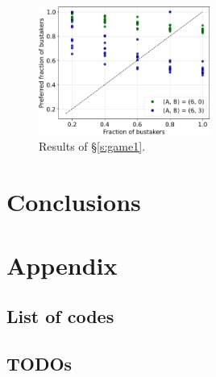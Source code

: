 \documentclass[12pt,notitlepage]{article}
\begin{document}
\begin{figure}
\centering
\includegraphics[width=0.5\textwidth]{20210616-OPT1/c_grid_study1/UTC-20210621-232339/e_evo_plots/evo}

\caption{%
	\protect{}
	Results of \S\ref{s:game1}.
}
\label{f:game1}
\end{figure}




\section{Conclusions}




\clearpage
\renewcommand*{\bibfont}{\normalfont\small}
\printbibliography %




\section{Appendix}

\subsection{List of codes} \label{s:code}

\begin{center}
\SHOWCODES
\end{center}


\subsection{TODOs} 
\SHOWTODOS



\leavevmode\vfill{\tiny\color{lightgray}\hfill{\DTMnow}}
\end{document}
